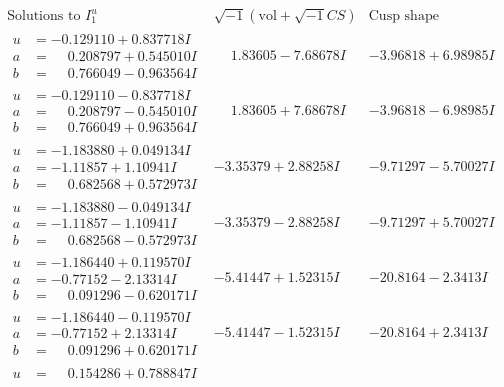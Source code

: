 \documentclass[1p]{elsarticle_modified}
\theoremstyle{definition}
\newcommand{\I}{\sqrt{-1}}
\begin{document}
$$\begin{array}{c|c|c}  
\text{Solutions to }I^u_{1}& \I (\text{vol} + \sqrt{-1}CS) & \text{Cusp shape}\\
 \hline 
\begin{aligned}
u &= -0.129110 + 0.837718 I \\
a &= \phantom{-}0.208797 + 0.545010 I \\
b &= \phantom{-}0.766049 - 0.963564 I\end{aligned}
 & \phantom{-}1.83605 - 7.68678 I & -3.96818 + 6.98985 I \\ \hline\begin{aligned}
u &= -0.129110 - 0.837718 I \\
a &= \phantom{-}0.208797 - 0.545010 I \\
b &= \phantom{-}0.766049 + 0.963564 I\end{aligned}
 & \phantom{-}1.83605 + 7.68678 I & -3.96818 - 6.98985 I \\ \hline\begin{aligned}
u &= -1.183880 + 0.049134 I \\
a &= -1.11857 + 1.10941 I \\
b &= \phantom{-}0.682568 + 0.572973 I\end{aligned}
 & -3.35379 + 2.88258 I & -9.71297 - 5.70027 I \\ \hline\begin{aligned}
u &= -1.183880 - 0.049134 I \\
a &= -1.11857 - 1.10941 I \\
b &= \phantom{-}0.682568 - 0.572973 I\end{aligned}
 & -3.35379 - 2.88258 I & -9.71297 + 5.70027 I \\ \hline\begin{aligned}
u &= -1.186440 + 0.119570 I \\
a &= -0.77152 - 2.13314 I \\
b &= \phantom{-}0.091296 - 0.620171 I\end{aligned}
 & -5.41447 + 1.52315 I & -20.8164 - 2.3413 I \\ \hline\begin{aligned}
u &= -1.186440 - 0.119570 I \\
a &= -0.77152 + 2.13314 I \\
b &= \phantom{-}0.091296 + 0.620171 I\end{aligned}
 & -5.41447 - 1.52315 I & -20.8164 + 2.3413 I \\ \hline\begin{aligned}
u &= \phantom{-}0.154286 + 0.788847 I \\

\end{aligned}
\end{array}$$
\end{document}
